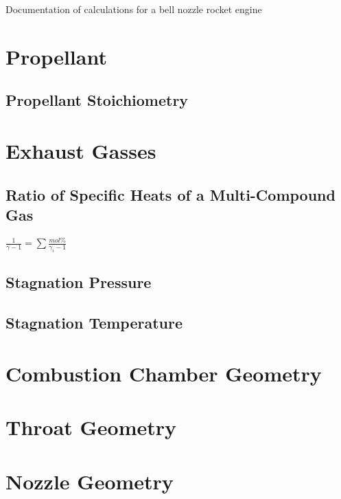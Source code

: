 \documentclass{article}
\begin{document}
Documentation of calculations for a bell nozzle rocket engine

\pagebreak

\section{Propellant}

\subsection{Propellant Stoichiometry}



\pagebreak
\section{Exhaust Gasses}

\subsection{Ratio of Specific Heats of a Multi-Compound Gas}

$\frac{1}{\gamma-1}=\sum\frac{mol\%}{\gamma_i-1}$

\subsection{Stagnation Pressure}



\subsection{Stagnation Temperature}


\pagebreak
\section{Combustion Chamber Geometry}

\pagebreak
\section{Throat Geometry}

\pagebreak
\section{Nozzle Geometry}
\end{document}
